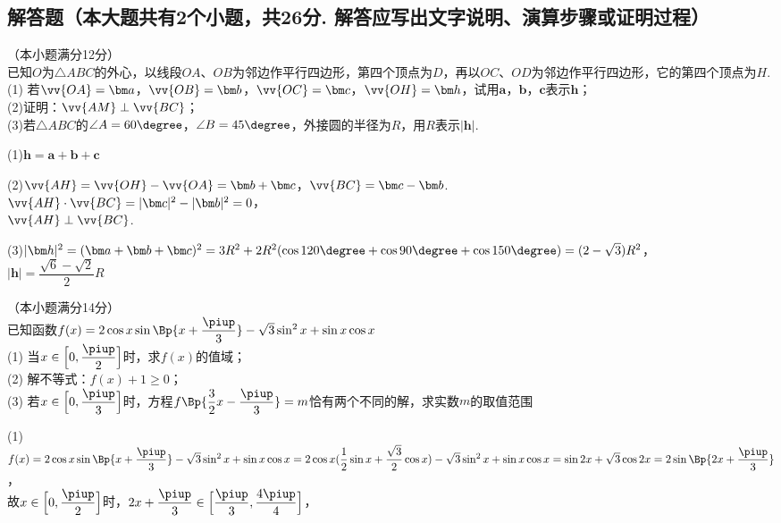 \begin{exercise}
\section{解答题（本大题共有2个小题，共26分. 解答应写出文字说明、演算步骤或证明过程）}
  \item
    （本小题满分12分）\\
    已知$O$为$\triangle{ABC}$的外心，以线段$OA$、$OB$为邻边作平行四边形，第四个顶点为$D$，再以$OC$、$OD$为邻边作平行四边形，它的第四个顶点为$H$.\\
    (1) 若$\vv{OA}=\bm a$，$\vv{OB}=\bm b$，$\vv{OC}=\bm c$，$\vv{OH}=\bm h$，试用$\bm a$，$\bm b$，$\bm c$表示$\bm h$；\\
    (2)证明：$\vv{AM}\perp\vv{BC}$；\\
    (3)若$\triangle{ABC}$的$\angle{A}=60\degree$，$\angle{B}=45\degree$，外接圆的半径为$R$，用$R$表示$|\bm h|$.
    \begin{answer}
      (1)$\bm h=\bm a+\bm b+\bm c$\par
      (2)\because $\vv{AH}=\vv{OH}-\vv{OA}=\bm b+\bm c$，$\vv{BC}=\bm c-\bm b$.\\
         \therefore $\vv{AH}\cdot\vv{BC}=|\bm c|^2-|\bm b|^2=0$，\\
         \therefore $\vv{AH}\perp\vv{BC}$.\par
      (3)\because$|\bm h|^2=(\bm a+\bm b+\bm c)^2=3R^2+2R^2(\cos120\degree+\cos90\degree+\cos150\degree)=(2-\sqrt3)R^2$，\\
         \therefore $|\bm h|=\dfrac{\sqrt6-\sqrt2}2 R$
    \end{answer}
  \vspace{12em}
  \item
    （本小题满分14分）\\
    已知函数$f(x)=2\cos x\sin\Bp{x+\dfrac{\piup}3}-\sqrt3\sin^2x+\sin x\cos x$\\
    (1) 当$x\in\Bigl[0,\dfrac{\piup}2\Bigr]$时，求$f(x)$的值域；\\
    (2) 解不等式：$f(x)+1\geq 0$；\\
    (3) 若$x\in\Bigl[0,\dfrac{\piup}3\Bigr]$时，方程$f\Bp{\dfrac32x-\dfrac{\piup}3}=m$恰有两个不同的解，求实数$m$的取值范围
    \begin{answer}
      (1) $f(x)=2\cos x\sin\Bp{x+\dfrac{\piup}3}-\sqrt3\sin^2x+\sin x\cos x
               =2\cos x(\dfrac12\sin x+\dfrac{\sqrt3}2\cos x)-\sqrt3\sin^2x+\sin x\cos x
               =\sin{2x}+\sqrt3\cos{2x}
               =2\sin\Bp{2x+\dfrac{\piup}3}$，\\
          故$x\in\Bigl[0,\dfrac{\piup}2\Bigr]$时，$2x+\dfrac{\piup}3 \in\Bigl[\dfrac{\piup}3,\dfrac{4\piup}4\Bigr]$，\\

\end{answer}
\end{exercise}
